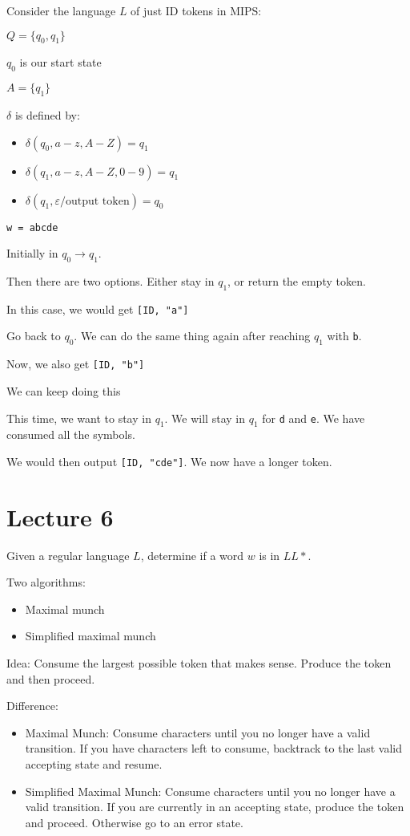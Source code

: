 \documentclass{article}
\begin{document}
Consider the language \(L\) of just ID tokens in MIPS:

\(Q = \{q_0, q_1\}\)

\(q_0\) is our start state

\(A = \{q_1\}\)

\(\delta\) is defined by:
\begin{itemize}
    \item \(\delta(q_0, a-z, A-Z) = q_1\)
    \item \(\delta(q_1, a-z, A-Z, 0-9) = q_1\)
    \item \(\delta\left( q_1, {\varepsilon}\text{/output token} \right) = q_0\)
\end{itemize}

\texttt{w\ =\ abcde}

Initially in \(q_0 \to q_1\).

Then there are two options. Either stay in \(q_1\), or return the empty
token.

In this case, we would get \texttt{{[}ID,\ "a"{]}}

Go back to \(q_0\). We can do the same thing again after reaching
\(q_1\) with \texttt{b}.

Now, we also get \texttt{{[}ID,\ "b"{]}}

We can keep doing this

This time, we want to stay in \(q_1\). We will stay in \(q_1\) for
\texttt{d} and \texttt{e}. We have consumed all the symbols.

We would then output \texttt{{[}ID,\ "cde"{]}}. We now have a longer
token.

\section{Lecture 6}\label{lecture-6}

Given a regular language \(L\), determine if a word \(w\) is in \(LL*\).

Two algorithms:
\begin{itemize}
    \item Maximal munch
    \item Simplified maximal munch
\end{itemize}

Idea: Consume the largest possible token that makes sense. Produce the
token and then proceed.

Difference:
\begin{itemize}
\item Maximal Munch: Consume characters until you no longer have
a valid transition. If you have characters left to consume, backtrack to
the last valid accepting state and resume.
\item Simplified Maximal Munch:
Consume characters until you no longer have a valid transition. If you
are currently in an accepting state, produce the token and proceed.
Otherwise go to an error state.
\end{itemize}
\end{document}
